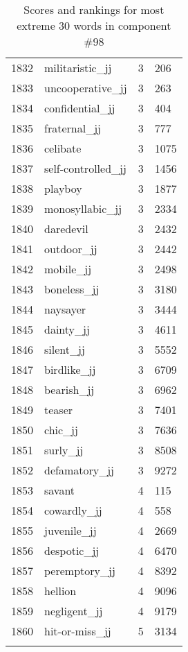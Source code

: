 \begin{longtable}[!htbp]{| rlr@{.}l |}
    1832 & militaristic\_jj & 3 & 206 \\
    1833 & uncooperative\_jj & 3 & 263 \\
    1834 & confidential\_jj & 3 & 404 \\
    1835 & fraternal\_jj & 3 & 777 \\
    1836 & celibate & 3 & 1075 \\
    1837 & self-controlled\_jj & 3 & 1456 \\
    1838 & playboy & 3 & 1877 \\
    1839 & monosyllabic\_jj & 3 & 2334 \\
    1840 & daredevil & 3 & 2432 \\
    1841 & outdoor\_jj & 3 & 2442 \\
    1842 & mobile\_jj & 3 & 2498 \\
    1843 & boneless\_jj & 3 & 3180 \\
    1844 & naysayer & 3 & 3444 \\
    1845 & dainty\_jj & 3 & 4611 \\
    1846 & silent\_jj & 3 & 5552 \\
    1847 & birdlike\_jj & 3 & 6709 \\
    1848 & bearish\_jj & 3 & 6962 \\
    1849 & teaser & 3 & 7401 \\
    1850 & chic\_jj & 3 & 7636 \\
    1851 & surly\_jj & 3 & 8508 \\
    1852 & defamatory\_jj & 3 & 9272 \\
    1853 & savant & 4 & 115 \\
    1854 & cowardly\_jj & 4 & 558 \\
    1855 & juvenile\_jj & 4 & 2669 \\
    1856 & despotic\_jj & 4 & 6470 \\
    1857 & peremptory\_jj & 4 & 8392 \\
    1858 & hellion & 4 & 9096 \\
    1859 & negligent\_jj & 4 & 9179 \\
    1860 & hit-or-miss\_jj & 5 & 3134 \\
    \hline
    \caption{Scores and rankings for most extreme 30 words in component \#98} \\
\end{longtable}
